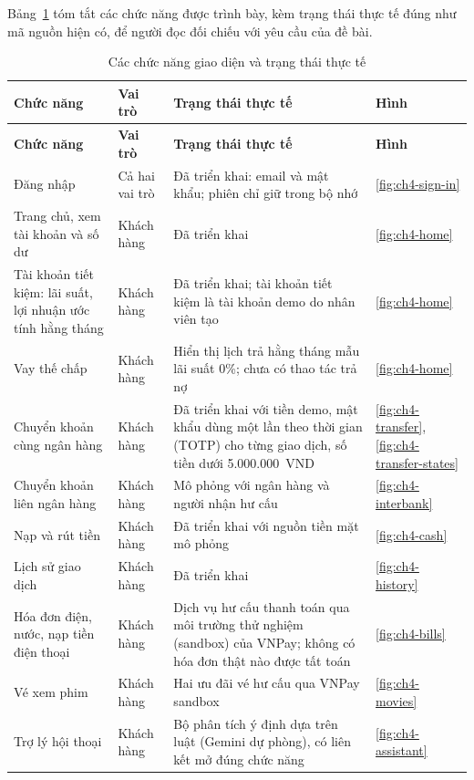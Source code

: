 Bảng~\ref{tab:ch4-functions} tóm tắt các chức năng được trình bày, kèm trạng thái thực tế đúng như mã nguồn hiện có, để người đọc đối chiếu với yêu cầu của đề bài.

\begin{longtable}{@{}p{}p{}p{}p{}@{}}
\caption{Các chức năng giao diện và trạng thái thực tế}\label{tab:ch4-functions}\\
\toprule
\textbf{Chức năng} & \textbf{Vai trò} & \textbf{Trạng thái thực tế} & \textbf{Hình}\\
\midrule
\endfirsthead
\toprule
\textbf{Chức năng} & \textbf{Vai trò} & \textbf{Trạng thái thực tế} & \textbf{Hình}\\
\midrule
\endhead
\bottomrule
\endlastfoot
Đăng nhập & Cả hai vai trò & Đã triển khai: email và mật khẩu; phiên chỉ giữ trong bộ nhớ & \ref{fig:ch4-sign-in}\\
Trang chủ, xem tài khoản và số dư & Khách hàng & Đã triển khai & \ref{fig:ch4-home}\\
Tài khoản tiết kiệm: lãi suất, lợi nhuận ước tính hằng tháng & Khách hàng & Đã triển khai; tài khoản tiết kiệm là tài khoản demo do nhân viên tạo & \ref{fig:ch4-home}\\
Vay thế chấp & Khách hàng & Hiển thị lịch trả hằng tháng mẫu lãi suất 0\%; chưa có thao tác trả nợ & \ref{fig:ch4-home}\\
Chuyển khoản cùng ngân hàng & Khách hàng & Đã triển khai với tiền demo, mật khẩu dùng một lần theo thời gian (TOTP) cho từng giao dịch, số tiền dưới 5.000.000~VND & \ref{fig:ch4-transfer}, \ref{fig:ch4-transfer-states}\\
Chuyển khoản liên ngân hàng & Khách hàng & Mô phỏng với ngân hàng và người nhận hư cấu & \ref{fig:ch4-interbank}\\
Nạp và rút tiền & Khách hàng & Đã triển khai với nguồn tiền mặt mô phỏng & \ref{fig:ch4-cash}\\
Lịch sử giao dịch & Khách hàng & Đã triển khai & \ref{fig:ch4-history}\\
Hóa đơn điện, nước, nạp tiền điện thoại & Khách hàng & Dịch vụ hư cấu thanh toán qua môi trường thử nghiệm (sandbox) của VNPay; không có hóa đơn thật nào được tất toán & \ref{fig:ch4-bills}\\
Vé xem phim & Khách hàng & Hai ưu đãi vé hư cấu qua VNPay sandbox & \ref{fig:ch4-movies}\\
Trợ lý hội thoại & Khách hàng & Bộ phân tích ý định dựa trên luật (Gemini dự phòng), có liên kết mở đúng chức năng & \ref{fig:ch4-assistant}\\

\end{longtable}
